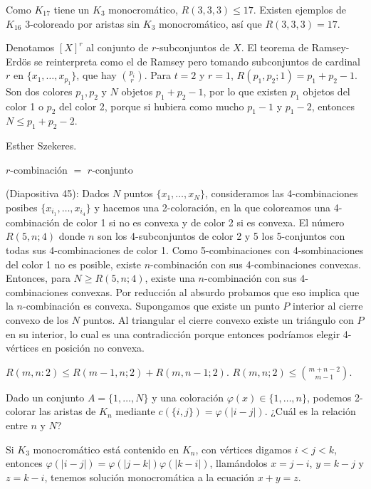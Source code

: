 \documentclass[TGyGC.tex]{subfiles}
\begin{document}
Como $K_{17}$ tiene un $K_3$ monocromático, $R(3,3,3)\leq 17$. Existen ejemplos de $K_16$ 3-coloreado por aristas sin $K_3$ monocromático, así que $R(3,3,3)=17$.

Denotamos $[X]^r$ al conjunto de $r$-subconjuntos de $X$. El teorema de Ramsey-Erdös se reinterpreta como el de Ramsey pero tomando subconjuntos de cardinal $r$ en $\{x_1,\dots, x_{p_1}\}$, que hay $\binom{p_i}{r}$. Para $t=2$ y $r=1$, $R(p_1,p_2;1)=p_1+p_2-1$. Son dos colores $p_1,p_2$ y $N$ objetos $p_1+p_2-1$, por lo que existen $p_1$ objetos del color 1 o $p_2$ del color 2, porque si hubiera como mucho $p_1-1$ y $p_1-2$, entonces $N\leq p_1+p_2-2$.  

Esther Szekeres. 

$r$-combinación $=$ $r$-conjunto


(Diapositiva 45): Dados $N$ puntos $\{x_1,\dots, x_N\}$, consideramos las 4-combinaciones posibes $\{x_{i_1},\dots, x_{i_4}\}$ y hacemos una 2-coloración, en la que coloreamos una 4-combinación de color 1 si no es convexa y de color 2 si es convexa. El número $R(5,n;4)$ donde $n$ son los 4-subconjuntos de color 2 y 5 los 5-conjuntos con todas sus 4-combinaciones de color 1. Como 5-combinaciones con 4-sombinaciones del color 1 no es posible, existe $n$-combinación con sus 4-combinaciones convexas. Entonces, para $N\geq R(5,n;4)$, existe una $n$-combinación con sus $4$-combinaciones convexas. Por reducción al absurdo probamos que eso implica que la $n$-combinación es convexa. Supongamos que existe un punto $P$ interior al cierre convexo de los $N$ puntos. Al triangular el cierre convexo existe un triángulo con $P$ en su interior, lo cual es una contradicción porque entonces podríamos elegir 4-vértices en posición no convexa. 

\begin{teorema}
$R(m,n:2)\leq R(m-1,n;2)+R(m,n-1;2)$. $R(m,n;2)\leq\binom{m+n-2}{m-1}$. 
\end{teorema}


Dado un conjunto $A=\{1,\dots, N\}$ y una coloración $\varphi(x)\in\{1,\dots, n\}$, podemos 2-colorar las aristas de $K_n$ mediante $c(\{i,j\})=\varphi(|i-j|)$. ¿Cuál es la relación entre $n$ y $N$?

Si $K_3$ monocromático está contenido en $K_n$, con vértices digamos $i<j<k$, entonces $\varphi(|i-j|)=\varphi(|j-k|)\varphi(|k-i|)$, llamándolos $x=j-i$, $y=k-j$ y $z=k-i$, tenemos solución monocromática a la ecuación $x+y=z$. 
\end{document}
